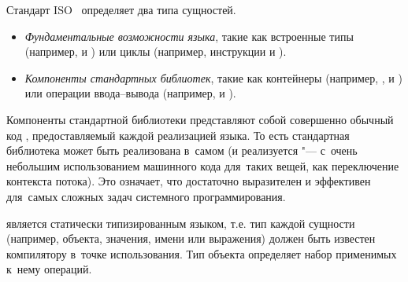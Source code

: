 Стандарт ISO~ определяет два типа сущностей.
\begin{itemize}
\item \textit{Фундаментальные возможности языка}, такие как встроенные типы (например,  и ) или циклы (например, инструкции  и ).

\item \textit{Компоненты стандартных библиотек}, такие как контейнеры (например, , и ) или операции ввода--вывода (например, \code{<<} и ).
\end{itemize}

Компоненты стандартной библиотеки представляют собой совершенно обычный код , предоставляемый каждой реализацией языка. То есть стандартная библиотека  может быть реализована в~самом  (и реализуется "--- с~очень небольшим использованием машинного кода для~таких вещей, как переключение контекста потока). Это означает, что  достаточно выразителен и эффективен для~самых сложных задач системного программирования.

 является статически типизированным языком, т.е. тип каждой сущности (например, объекта, значения, имени или выражения) должен быть известен компилятору в~точке использования. Тип объекта определяет набор применимых к~нему операций.



